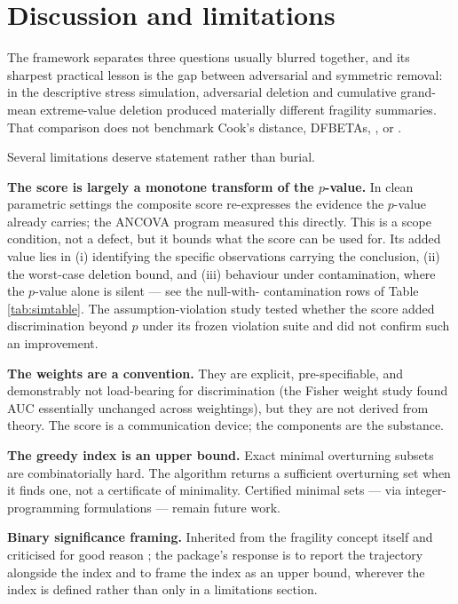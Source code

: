 \section{Discussion and limitations}\label{discussion-and-limitations}

The framework separates three questions usually blurred together, and its
sharpest practical lesson is the gap between adversarial and symmetric
removal: in the descriptive stress simulation, adversarial deletion and
cumulative grand-mean extreme-value deletion produced materially different
fragility summaries. That comparison does not benchmark Cook's distance,
DFBETAs, , or .

Several limitations deserve statement rather than burial.

\textbf{The score is largely a monotone transform of the \(p\)-value.} In clean
parametric settings the composite score re-expresses the evidence the
\(p\)-value already carries; the ANCOVA program measured this directly. This is
a scope condition, not a defect, but it bounds what the score can be used for.
Its added value lies in (i) identifying the specific observations carrying the
conclusion, (ii) the worst-case deletion bound, and (iii) behaviour under
contamination, where the \(p\)-value alone is silent --- see the null-with-
contamination rows of Table \ref{tab:simtable}. The assumption-violation study
tested whether the score added discrimination beyond \(p\) under its frozen
violation suite and did not confirm such an improvement.

\textbf{The weights are a convention.} They are explicit, pre-specifiable, and
demonstrably not load-bearing for discrimination (the Fisher weight study
found AUC essentially unchanged across weightings), but they are not derived
from theory. The score is a communication device; the components are the
substance.

\textbf{The greedy index is an upper bound.} Exact minimal overturning subsets are
combinatorially hard. The algorithm returns a sufficient overturning set when
it finds one, not a certificate of minimality. Certified minimal sets --- via
integer-programming formulations --- remain future work.

\textbf{Binary significance framing.} Inherited from the fragility concept itself
and criticised for good reason \citep{potter2020}; the package's response is to
report the trajectory alongside the index and to frame the index as an upper
bound, wherever the index is defined rather than only in a limitations
section.

